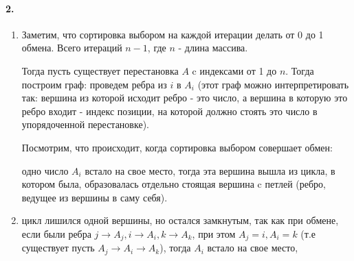 \documentclass[]{article}
\begin{document}
\newpage

\paragraph{2.}
\begin{enumerate}
\item Заметим, что сортировка выбором на каждой итерации делать от 0 до 1 обмена. Всего итераций $n - 1$, где $n$ - длина массива.

Тогда пусть существует перестановка $A$ c индексами от 1 до $n$. Тогда построим граф: проведем ребра из $i$ в $A_i$ (этот граф можно интерпретировать так: вершина из которой исходит ребро - это число, а вершина в которую это ребро входит - индекс позиции, на которой должно стоять это число в упорядоченной перестановке).

Посмотрим, что происходит, когда сортировка выбором совершает обмен: 


одно число $A_i$ встало на свое место, тогда эта вершина вышла из цикла, в котором была, образовалась отдельно стоящая вершина c петлей (ребро, ведущее из вершины в саму себя).
\item цикл лишился одной вершины, но остался замкнутым, так как при обмене, если были ребра $j \rightarrow A_j,  i \rightarrow A_i, k \rightarrow A_k$, при этом $A_j = i, A_i = k$ (т.е существует пусть $A_j \rightarrow A_i \rightarrow A_k$), тогда $A_i$ встало на свое место, 
\end{enumerate}
\end{document}
